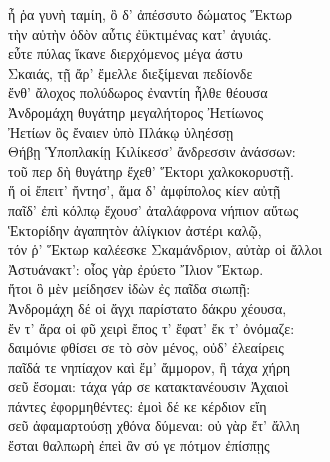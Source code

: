 \begin{Versi}[390]
ἦ ῥα γυνὴ ταμίη, ὃ δ' ἀπέσσυτο δώματος Ἕκτωρ\\
τὴν αὐτὴν ὁδὸν αὖτις ἐϋκτιμένας κατ' ἀγυιάς.\\
εὖτε πύλας ἵκανε διερχόμενος μέγα άστυ\\
Σκαιάς, τῇ ἄρ' ἔμελλε διεξίμεναι πεδίονδε\\
ἔνθ' ἄλοχος πολύδωρος ἐναντίη ἦλθε θέουσα\\ %
Ἀνδρομάχη θυγάτηρ μεγαλήτορος Ἠετίωνος\\ %
Ἠετίων ὃς ἔναιεν ὑπὸ Πλάκῳ ὑληέσσῃ\\ %
Θήβῃ Ὑποπλακίῃ Κιλίκεσσ' ἄνδρεσσιν ἀνάσσων:\\
τοῦ περ δὴ θυγάτηρ ἔχεθ' Ἕκτορι χαλκοκορυστῇ.\\
ἥ οἱ ἔπειτ' ἤντησ', ἅμα δ' ἀμφίπολος κίεν αὐτῇ\\ %
παῖδ' ἐπὶ κόλπῳ ἔχουσ' ἀταλάφρονα νήπιον αὔτως\\ %
Ἑκτορίδην ἀγαπητὸν ἀλίγκιον ἀστέρι καλῷ,\\ %
τόν ῥ' Ἕκτωρ καλέεσκε Σκαμάνδριον, αὐτὰρ οἱ ἄλλοι\\
Ἀστυάνακτ': οἶος γὰρ ἐρύετο Ἴλιον Ἕκτωρ.\\
ἤτοι ὃ μὲν μείδησεν ἰδὼν ἐς παῖδα σιωπῇ:\\
Ἀνδρομάχη δέ οἱ ἄγχι παρίστατο δάκρυ χέουσα,\\
ἔν τ' ἄρα οἱ φῦ χειρὶ ἔπος τ' ἔφατ' ἔκ τ' ὀνόμαζε:\\
δαιμόνιε φθίσει σε τὸ σὸν μένος, οὐδ' ἐλεαίρεις\\
παῖδά τε νηπίαχον καὶ ἔμ' ἄμμορον, ἣ τάχα χήρη\\
σεῦ ἔσομαι: τάχα γάρ σε κατακτανέουσιν Ἀχαιοὶ\\
πάντες ἐφορμηθέντες: ἐμοὶ δέ κε κέρδιον εἴη\\
σεῦ ἀφαμαρτούσῃ χθόνα δύμεναι: οὐ γὰρ ἔτ' ἄλλη\\
ἔσται θαλπωρὴ ἐπεὶ ἂν σύ γε πότμον ἐπίσπῃς\\ \ladd{\ldots}\\
\end{Versi}
